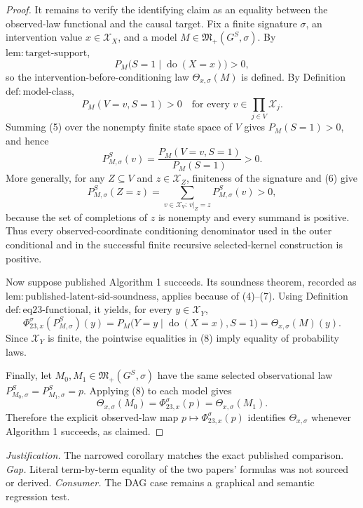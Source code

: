 \documentclass{article}
\begin{document}
\begin{proof}
It remains to verify the identifying claim as an equality between the observed-law functional and the causal target.  Fix a finite signature \(\sigma\), an intervention value \(x\in\mathcal X_X\), and a model \(M\in\mathfrak M_+(G^S,\sigma)\).  By \(\mathrm{lem:target\text{-}support}\),
\[
  P_M\bigl(S=1\mid\operatorname{do}(X=x)\bigr)>0, \tag{4}
\]
so the intervention-before-conditioning law \(\Theta_{x,\sigma}(M)\) is defined.  By Definition \(\mathrm{def:model\text{-}class}\),
\[
  P_M(V=v,S=1)>0
  \quad\text{for every }v\in\prod_{j\in V}\mathcal X_j. \tag{5}
\]
Summing (5) over the nonempty finite state space of \(V\) gives \(P_M(S=1)>0\), and hence
\[
  P_{M,\sigma}^S(v)
  =\frac{P_M(V=v,S=1)}{P_M(S=1)}>0. \tag{6}
\]
More generally, for any \(Z\subseteq V\) and \(z\in\mathcal X_Z\), finiteness of the signature and (6) give
\[
  P_{M,\sigma}^S(Z=z)
  =\sum_{v\in\mathcal X_V:\,v|_Z=z}P_{M,\sigma}^S(v)>0, \tag{7}
\]
because the set of completions of \(z\) is nonempty and every summand is positive.  Thus every observed-coordinate conditioning denominator used in the outer conditional and in the successful finite recursive selected-kernel construction is positive.

Now suppose published Algorithm 1 succeeds.  Its soundness theorem, recorded as \(\mathrm{lem:published\text{-}latent\text{-}sid\text{-}soundness}\), applies because of (4)--(7).  Using Definition \(\mathrm{def:eq23\text{-}functional}\), it yields, for every \(y\in\mathcal X_Y\),
\[
 \Phi_{23,x}^{\sigma}(P_{M,\sigma}^S)(y)
 =P_M\bigl(Y=y\mid\operatorname{do}(X=x),S=1\bigr)
 =\Theta_{x,\sigma}(M)(y). \tag{8}
\]
Since \(\mathcal X_Y\) is finite, the pointwise equalities in (8) imply equality of probability laws.

Finally, let \(M_0,M_1\in\mathfrak M_+(G^S,\sigma)\) have the same selected observational law \(P_{M_0,\sigma}^S=P_{M_1,\sigma}^S=p\).  Applying (8) to each model gives
\[
  \Theta_{x,\sigma}(M_0)
  =\Phi_{23,x}^{\sigma}(p)
  =\Theta_{x,\sigma}(M_1). \tag{9}
\]
Therefore the explicit observed-law map \(p\mapsto\Phi_{23,x}^{\sigma}(p)\) identifies \(\Theta_{x,\sigma}\) whenever Algorithm 1 succeeds, as claimed.
\end{proof}
\par\smallskip\noindent \textit{Justification.} The narrowed corollary matches the exact published comparison. \textit{Gap.} Literal term-by-term equality of the two papers' formulas was not sourced or derived. \textit{Consumer.} The DAG case remains a graphical and semantic regression test.
\end{document}

